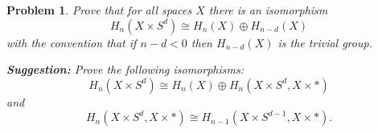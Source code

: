 
\usepackage[T1]{fontenc}
\usepackage{tikz-cd}

\usepackage{thmtools}
\usepackage{fancyhdr}

\usepackage{csquotes}

\usepackage{polynom}

\newsavebox{\myheadbox}
{
\cfoot{\thepage}
}
\fancyhf{}
{
\cfoot{\thepage}
}

\pagestyle{normalpage}


\date{}

\renewcommand{\C}{\mathbb{C}}
\newcommand{\GL}{\mathsf{GL}}
\newcommand{\Z}{\mathbb{Z}}
\renewcommand{\R}{\mathbb{R}}
\newcommand{\Res}{\mathsf{Res}^{D_{2n}}_{\langle x\rangle}}
\newcommand{\triv}{\mathbb{1}}
\newcommand{\Char}{\mathsf{Char}}
\newcommand{\Fix}{\mathsf{Fix}}
\newcommand{\Span}{\mathsf{Span}}
\newcommand{\Tr}{\mathsf{Tr}}
\newcommand{\Ker}{\mathsf{Ker}}
\renewcommand{\Im}{\mathsf{Im}}
\newcommand{\Cent}{\mathsf{Cent}}
\newcommand{\Id}{\mathsf{Id}}


\thispagestyle{firstpage}
\theoremstyle{normalhead}
\newtheorem{problem}{Problem}
\newtheorem{lemma}{Lemma}


\begin{problem}
  Prove that for all spaces $X$ there is an isomorphism
\[
H_n(X \times S^d) \cong H_n(X)\oplus H_{n-d}(X)
\]
with the convention that if $n-d < 0$ then $H_{n-d}(X)$ is the trivial group.

\noindent
\textbf{Suggestion:} Prove the following isomorphisms:
\[
H_n(X \times S^d) \cong H_n(X)\oplus H_{n}(X\times S^{d},   X\times *)
\]
and
\[
H_{n}(X\times S^{d}, X\times *) \cong H_{n-1}(X\times S^{d-1},  X\times *).
\]
\end{problem}

